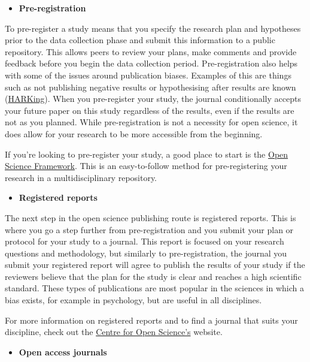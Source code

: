 \documentclass[
]{book}
\providecommand{\tightlist}{%
  \setlength{\itemsep}{0pt}\setlength{\parskip}{0pt}}
\begin{document}
\begin{itemize}
\tightlist
\item
  \textbf{Pre-registration}
\end{itemize}

To pre-register a study means that you specify the research plan and hypotheses prior to the data collection phase and submit this information to a public repository. This allows peers to review your plans, make comments and provide feedback before you begin the data collection period. Pre-registration also helps with some of the issues around publication biases. Examples of this are things such as not publishing negative results or hypothesising after results are known (\href{https://pubmed.ncbi.nlm.nih.gov/15647155/}{HARKing}). When you pre-register your study, the journal conditionally accepts your future paper on this study regardless of the results, even if the results are not as you planned. While pre-registration is not a necessity for open science, it does allow for your research to be more accessible from the beginning.

If you're looking to pre-register your study, a good place to start is the \href{https://www.cos.io/initiatives/prereg}{Open Science Framework}. This is an easy-to-follow method for pre-registering your research in a multidisciplinary repository.

\begin{itemize}
\tightlist
\item
  \textbf{Registered reports}
\end{itemize}

The next step in the open science publishing route is registered reports. This is where you go a step further from pre-registration and you submit your plan or protocol for your study to a journal. This report is focused on your research questions and methodology, but similarly to pre-registration, the journal you submit your registered report will agree to publish the results of your study if the reviewers believe that the plan for the study is clear and reaches a high scientific standard. These types of publications are most popular in the sciences in which a bias exists, for example in psychology, but are useful in all disciplines.

For more information on registered reports and to find a journal that suits your discipline, check out the \href{https://www.cos.io/initiatives/registered-reports}{Centre for Open Science's} website.

\begin{itemize}
\tightlist
\item
  \textbf{Open access journals}
\end{itemize}
\end{document}
